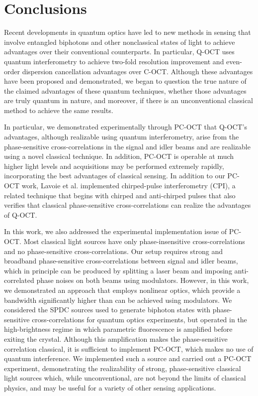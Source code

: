 \section{Conclusions}

Recent developments in quantum optics have led to new methods in sensing that involve entangled biphotons and other nonclassical states of light to achieve advantages over their conventional counterparts. In particular, Q-OCT uses quantum interferometry to achieve two-fold resolution improvement and even-order dispersion cancellation advantages over C-OCT. Although these advantages have been proposed and demonstrated, we began to question the true nature of the claimed advantages of these quantum techniques, whether those advantages are truly quantum in nature, and moreover, if there is an unconventional classical method to achieve the same results.

In particular, we demonstrated experimentally \cite{legouet-experimental} through PC-OCT that Q-OCT's advantages, although realizable using quantum interferometry, arise from the phase-sensitive cross-correlations in the signal and idler beams and are realizable using a novel classical technique. In addition, PC-OCT is operable at much higher light levels and acquisitions may be performed extremely rapidly, incorporating the best advantages of classical sensing. In addition to our PC-OCT work, Lavoie et al. \cite{lavoie-quantum} implemented chirped-pulse interferometry (CPI), a related technique that begins with chirped and anti-chirped pulses that also verifies that classical phase-sensitive cross-correlations can realize the advantages of Q-OCT.

In this work, we also addressed the experimental implementation issue of PC-OCT. Most classical light sources have only phase-insensitive cross-correlations and no phase-sensitive cross-correlations. Our setup requires strong and broadband phase-sensitive cross-correlations between signal and idler beams, which in principle can be produced by splitting a laser beam and imposing anti-correlated phase noises on both beams using modulators. However, in this work, we demonstrated an approach that employs nonlinear optics, which provide a bandwidth significantly higher than can be achieved using modulators. We considered the SPDC sources used to generate biphoton states with phase-sensitive cross-correlations for quantum optics experiments, but operated in the high-brightness regime in which parametric fluorescence is amplified before exiting the crystal. Although this amplification makes the phase-sensitive correlation classical, it is sufficient to implement PC-OCT, which makes no use of quantum interference. We implemented such a source and carried out a PC-OCT experiment, demonstrating the realizability of strong, phase-sensitive classical light sources which, while unconventional, are not beyond the limits of classical physics, and may be useful for a variety of other sensing applications.


